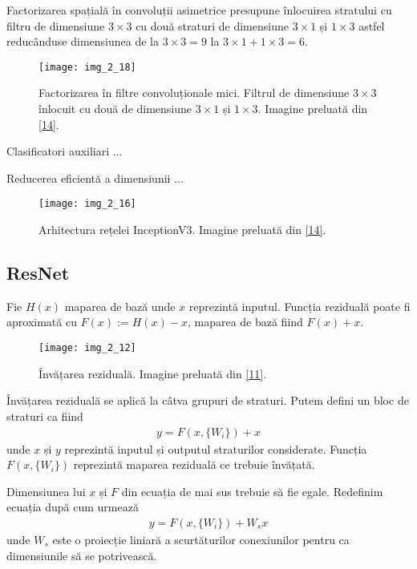 Factorizarea spațială în convoluții asimetrice presupune înlocuirea stratului cu filtru de dimensiune $3 \times 3$ cu două straturi de dimensiune $3 \times 1$ și $1 \times 3$ astfel reducânduse dimensiunea de la $3 \times 3 = 9$ la $3 \times 1 + 1 \times 3 = 6$. 
\begin{figure}[!h]
	\centering
	\texttt{[image: img\_2\_18]}
	\caption[Factorizarea spațială în convoluții asimetrice]{Factorizarea în filtre convoluționale mici. Filtrul de dimensiune $3 \times 3$ înlocuit cu două de dimensiune $3 \times 1$ și $1 \times 3$.  Imagine preluată din \hyperlink{guideinceptionv3}{[14]}.}
\end{figure}

Clasificatori auxiliari ...

Reducerea eficientă a dimensiunii ...

\begin{figure}[!h]
	\centering
	\texttt{[image: img\_2\_16]}
	\caption[Arhitectura InceptionV3]{Arhitectura rețelei InceptionV3. Imagine preluată din \hyperlink{guideinceptionv3}{[14]}.}
\end{figure}   


\subsection{ResNet}
Fie $H(x)$ maparea de bază unde $x$ reprezintă inputul. Funcția reziduală poate fi aproximată cu $F(x) := H(x) - x$, maparea de bază fiind $F(x) + x$.

\begin{figure}[!h]
	\centering
	\texttt{[image: img\_2\_12]}
	\caption[Învățarea reziduală]{Învățarea reziduală. Imagine preluată din \hyperlink{KaimingHeXiangyuZhangShaoqingRenJianSun}{[11]}.}
\end{figure}  

Învățarea reziduală se aplică la câtva grupuri de straturi. Putem defini un bloc de straturi ca fiind 
\begin{align}
	y = F(x,\{W_i\}) + x
\end{align}
unde $x$ și $y$ reprezintă inputul și outputul straturilor considerate. Funcția $F(x, \{W_i\})$ reprezintă maparea reziduală ce trebuie învățată.

Dimensiunea lui $x$ și $F$ din ecuația de mai sus trebuie să fie egale. Redefinim ecuația după cum urmează
\begin{align}
	y = F(x,\{W_i\}) + W_sx
\end{align}
unde $W_s$ este o proiecție liniară a scurtăturilor conexiunilor pentru ca dimensiunile să se potrivească.

